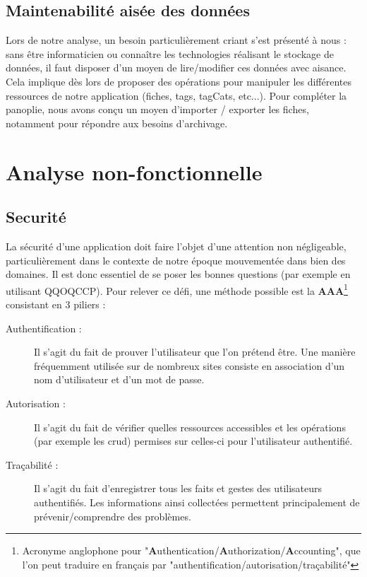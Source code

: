 \subsection*{Maintenabilité aisée des données}

Lors de notre analyse, un besoin particulièrement criant s'est présenté à nous : sans être informaticien ou connaître les technologies réalisant le stockage de données, il faut disposer d'un moyen de lire/modifier ces données avec aisance. \\

Cela implique dès lors de proposer des opérations pour manipuler les différentes ressources de notre application (\glspl{fiche}, \glspl{tag}, \glspl{tagCat}, etc...). Pour compléter la panoplie, nous avons conçu un moyen d'importer / exporter les \glspl{fiche}, notamment pour répondre aux besoins d'archivage.

\pagebreak


\section{Analyse non-fonctionnelle}

\subsection*{Securité}

La sécurité d'une application doit faire l'objet d'une attention non négligeable, particulièrement dans le contexte de notre époque mouvementée dans bien des domaines. Il est donc essentiel de se poser les bonnes questions (par exemple en utilisant \Gls{QQOQCCP}). Pour relever ce défi, une méthode possible est la \textbf{AAA}\footnote{Acronyme anglophone pour "\textbf{A}uthentication/\textbf{A}uthorization/\textbf{A}ccounting", que l'on peut traduire en français par "authentification/autorisation/traçabilité" }
consistant en 3 piliers : 

\begin{description}
    \item[Authentification :] Il s'agit du fait de prouver l'utilisateur que l'on prétend être. Une manière fréquemment utilisée sur de nombreux sites consiste en association d'un nom d'utilisateur et d'un mot de passe.
    \item[Autorisation :] Il s'agit du fait de vérifier quelles ressources accessibles et les opérations (par exemple les \Gls{crud}) permises sur celles-ci pour l'utilisateur authentifié.
    \item[Traçabilité :] Il s'agit du fait d'enregistrer tous les faits et gestes des utilisateurs authentifiés. Les informations ainsi collectées permettent principalement de prévenir/comprendre des problèmes. 
\end{description}

